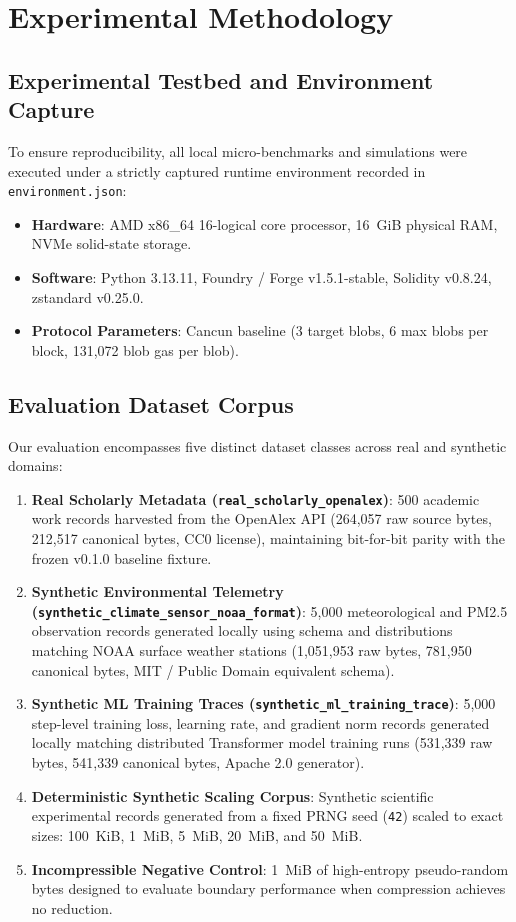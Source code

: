 \section{Experimental Methodology}
\label{sec:methodology}

\subsection{Experimental Testbed and Environment Capture}
To ensure reproducibility, all local micro-benchmarks and simulations were executed under a strictly captured runtime environment recorded in \texttt{environment.json}:
\begin{itemize}
    \item \textbf{Hardware}: AMD x86\_64 16-logical core processor, 16~GiB physical RAM, NVMe solid-state storage.
    \item \textbf{Software}: Python 3.13.11, Foundry / Forge v1.5.1-stable, Solidity v0.8.24, zstandard v0.25.0.
    \item \textbf{Protocol Parameters}: Cancun baseline (3 target blobs, 6 max blobs per block, 131,072 blob gas per blob).
\end{itemize}

\subsection{Evaluation Dataset Corpus}
Our evaluation encompasses five distinct dataset classes across real and synthetic domains:
\begin{enumerate}
    \item \textbf{Real Scholarly Metadata (\texttt{real\_scholarly\_openalex})}: 500 academic work records harvested from the OpenAlex API (264,057 raw source bytes, 212,517 canonical bytes, CC0 license), maintaining bit-for-bit parity with the frozen v0.1.0 baseline fixture.
    \item \textbf{Synthetic Environmental Telemetry (\texttt{synthetic\_climate\_sensor\_noaa\_format})}: 5,000 meteorological and PM2.5 observation records generated locally using schema and distributions matching NOAA surface weather stations (1,051,953 raw bytes, 781,950 canonical bytes, MIT / Public Domain equivalent schema).
    \item \textbf{Synthetic ML Training Traces (\texttt{synthetic\_ml\_training\_trace})}: 5,000 step-level training loss, learning rate, and gradient norm records generated locally matching distributed Transformer model training runs (531,339 raw bytes, 541,339 canonical bytes, Apache 2.0 generator).
    \item \textbf{Deterministic Synthetic Scaling Corpus}: Synthetic scientific experimental records generated from a fixed PRNG seed (\texttt{42}) scaled to exact sizes: 100~KiB, 1~MiB, 5~MiB, 20~MiB, and 50~MiB.
    \item \textbf{Incompressible Negative Control}: 1~MiB of high-entropy pseudo-random bytes designed to evaluate boundary performance when compression achieves no reduction.
\end{enumerate}

